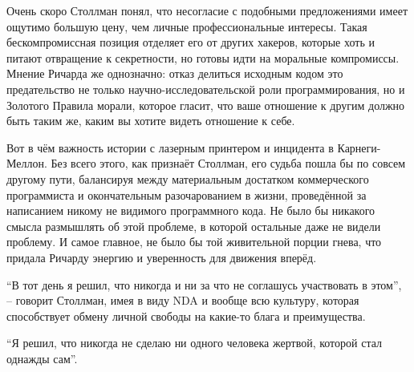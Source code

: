 Очень скоро Столлман понял, что несогласие с подобными предложениями имеет ощутимо большую цену, чем личные профессиональные интересы. Такая бескомпромиссная позиция отделяет его от других хакеров, которые хоть и питают отвращение к секретности, но готовы идти на моральные компромиссы. Мнение Ричарда же однозначно: отказ делиться исходным кодом это предательство не только научно-исследовательской роли программирования, но и Золотого Правила морали, которое гласит, что ваше отношение к другим должно быть таким же, каким вы хотите видеть отношение к себе.

Вот в чём важность истории с лазерным принтером и инцидента в Карнеги-Меллон. Без всего этого, как признаёт Столлман, его судьба пошла бы по совсем другому пути, балансируя между материальным достатком коммерческого программиста и окончательным разочарованием в жизни, проведённой за написанием никому не видимого программного кода. Не было бы никакого смысла размышлять об этой проблеме, в которой остальные даже не видели проблему. И самое главное, не было бы той живительной порции гнева, что придала Ричарду энергию и уверенность для движения вперёд.

\enquote{В тот день я решил, что никогда и ни за что не соглашусь участвовать в этом}, -- говорит Столлман, имея в виду NDA и вообще всю культуру, которая способствует обмену личной свободы на какие-то блага и преимущества.

\enquote{Я решил, что никогда не сделаю ни одного человека жертвой, которой стал однажды сам}.

\theendnotes
\setcounter{endnote}{0}

